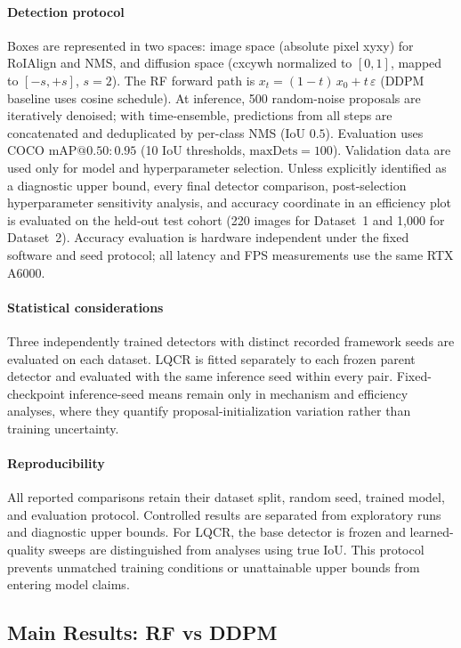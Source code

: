 \documentclass[journal,10pt]{IEEEtran}
\theoremstyle{definition}
\begin{document}
\paragraph{Detection protocol}
Boxes are represented in two spaces: image space (absolute pixel xyxy) for
RoIAlign and NMS, and diffusion space (cxcywh normalized to $[0,1]$, mapped
to $[-s, +s]$, $s{=}2$). The RF forward path is $x_t = (1{-}t)\,x_0 +
t\,\varepsilon$ (DDPM baseline uses cosine schedule). At inference, 500
random-noise proposals are iteratively denoised; with time-ensemble,
predictions from all steps are concatenated and deduplicated by per-class
NMS (IoU $0.5$). Evaluation uses COCO mAP$@0.50{:}0.95$ (10 IoU thresholds,
$\text{maxDets}{=}100$).
Validation data are used only for model and hyperparameter selection.
Unless explicitly identified as a diagnostic upper bound, every final detector
comparison, post-selection hyperparameter sensitivity analysis, and accuracy coordinate in an
efficiency plot is evaluated on the held-out test cohort (220 images for
Dataset~1 and 1,000 for Dataset~2). Accuracy evaluation is hardware independent
under the fixed software and seed protocol; all latency and FPS measurements
use the same RTX A6000.

\paragraph{Statistical considerations}
Three independently trained detectors with distinct recorded framework seeds
are evaluated on each dataset.
LQCR is fitted separately to each frozen parent detector and evaluated with
the same inference seed within every pair. Fixed-checkpoint inference-seed
means remain only in mechanism and efficiency analyses, where they quantify
proposal-initialization variation rather than training uncertainty.

\paragraph{Reproducibility}
All reported comparisons retain their dataset split, random seed, trained
model, and evaluation protocol. Controlled results are separated from
exploratory runs and diagnostic upper bounds. For LQCR, the base detector is
frozen and learned-quality sweeps are distinguished from analyses using true
IoU. This protocol prevents unmatched training conditions or unattainable
upper bounds from entering model claims.

\subsection{Main Results: RF vs DDPM}\label{sec:exp-rf-vs-ddpm}
\end{document}
